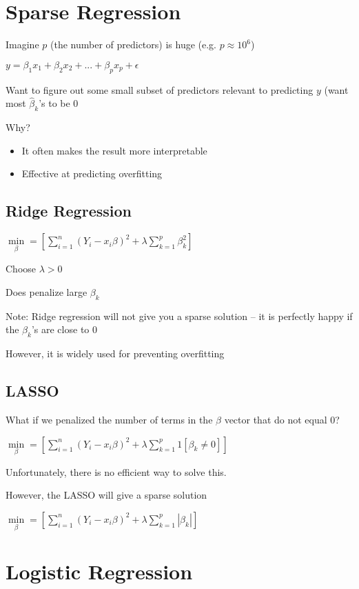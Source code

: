 \documentclass[twoside]{article}
\begin{document}
\section{Sparse Regression}

Imagine $p$ (the number of predictors) is huge (e.g. $p \approx 10^6$)

$y = \beta_1 x_1 + \beta_2 x_2 + ... + \beta_p x_p + \epsilon$

Want to figure out some small subset of predictors relevant to predicting $y$ (want most $\hat{\beta}_k$'s to be 0

Why? 
\begin{itemize}
\item It often makes the result more interpretable
\item Effective at predicting overfitting
\end{itemize}


\subsection{Ridge Regression}

$\min\limits_{\beta} = [ \sum\limits_{i=1}^n (Y_i - x_i\beta)^2 + \lambda \sum\limits_{k=1}^p \beta_k^2 ]$

Choose $\lambda > 0$

Does penalize large $\beta_k$

Note: Ridge regression will not give you a sparse solution -- it is perfectly happy if the $\beta_k$'s are close to 0

However, it is widely used for preventing overfitting

\subsection{LASSO}

What if we penalized the number of terms in the $\beta$ vector that do not equal 0?

$\min\limits_{\beta} = [ \sum\limits_{i=1}^n (Y_i - x_i\beta)^2 + \lambda \sum\limits_{k=1}^p 1[\beta_k \neq 0] ]$

Unfortunately, there is no efficient way to solve this.

However, the LASSO will give a sparse solution

$\min\limits_{\beta} = [ \sum\limits_{i=1}^n (Y_i - x_i\beta)^2 + \lambda \sum\limits_{k=1}^p |\beta_k| ]$







\section{Logistic Regression}
\end{document}

